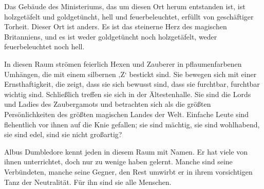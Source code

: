 Das Gebäude des Ministeriums, das um diesen Ort herum entstanden ist, ist holzgetäfelt und goldgetüncht, hell und feuerbeleuchtet, erfüllt von geschäftiger Torheit. Dieser Ort ist anders. Es ist das steinerne Herz des magischen Britanniens, und es ist weder goldgetüncht noch holzgetäfelt, weder feuerbeleuchtet noch hell.

In diesen Raum strömen feierlich Hexen und Zauberer in pflaumenfarbenen Umhängen, die mit einem silbernen ‚Z‘ bestickt sind. Sie bewegen sich mit einer Ernsthaftigkeit, die zeigt, dass sie sich bewusst sind, dass sie furchtbar, furchtbar wichtig sind. Schließlich treffen sie sich in der Ältestenhalle. Sie sind die Lords und Ladies des Zaubergamots und betrachten sich als die größten Persönlichkeiten des größten magischen Landes der Welt. Einfache Leute sind flehentlich vor ihnen auf die Knie gefallen; sie sind mächtig, sie sind wohlhabend, sie sind edel, sind sie nicht großartig?

Albus Dumbledore kennt jeden in diesem Raum mit Namen. Er hat viele von ihnen unterrichtet, doch nur zu wenige haben gelernt. Manche sind seine Verbündeten, manche seine Gegner, den Rest umwirbt er in ihrem vorsichtigen Tanz der Neutralität. Für ihn sind sie alle Menschen.

